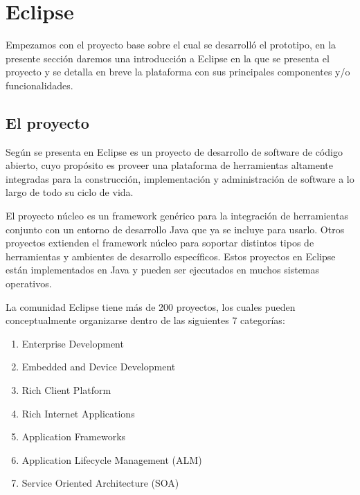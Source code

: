 \documentclass[a4paper,12pt,oneside]{book}
\begin{document}
\section{Eclipse}

Empezamos con el proyecto base sobre el cual se desarrolló el prototipo, en la presente sección daremos una introducción a Eclipse en la que se presenta el proyecto y se detalla en breve la plataforma con sus principales componentes y/o funcionalidades.


\subsection{El proyecto}

Según se presenta en \cite{EMFADG, Eclipse} Eclipse es un proyecto de desarrollo de software de código abierto, cuyo propósito es proveer una plataforma de herramientas altamente integradas para la construcción, implementación y administración de software a lo largo de todo su ciclo de vida. 

El proyecto núcleo es un framework genérico para la integración de herramientas conjunto con un entorno de desarrollo Java que ya se incluye para usarlo. Otros proyectos extienden el framework núcleo para soportar distintos tipos de herramientas y ambientes de desarrollo específicos. Estos proyectos en Eclipse están implementados en Java y pueden ser ejecutados en muchos sistemas operativos.

La comunidad Eclipse tiene más de 200 proyectos, los cuales pueden conceptualmente organizarse dentro de las siguientes 7 categorías:

\begin{enumerate}

\item Enterprise Development

\item    Embedded and Device Development

\item    Rich Client Platform

\item    Rich Internet Applications

\item    Application Frameworks

\item    Application Lifecycle Management (ALM)

\item    Service Oriented Architecture (SOA)

\end{enumerate}
\end{document}
